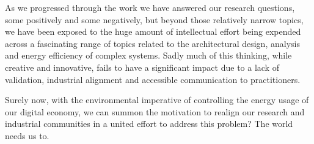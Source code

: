 As we progressed through the work we have answered our research questions, some positively and some negatively, but beyond those relatively narrow topics, we have been exposed to the huge amount of intellectual effort being expended across a fascinating range of topics related to the architectural design, analysis and energy efficiency of complex systems.  Sadly much of this thinking, while creative and innovative, fails to have a significant impact due to a lack of validation, industrial alignment and accessible communication to practitioners.

Surely now, with the environmental imperative of controlling the energy usage of our digital economy, we can summon the motivation to realign our research and industrial communities in a united effort to address this problem?  The world needs us to.


